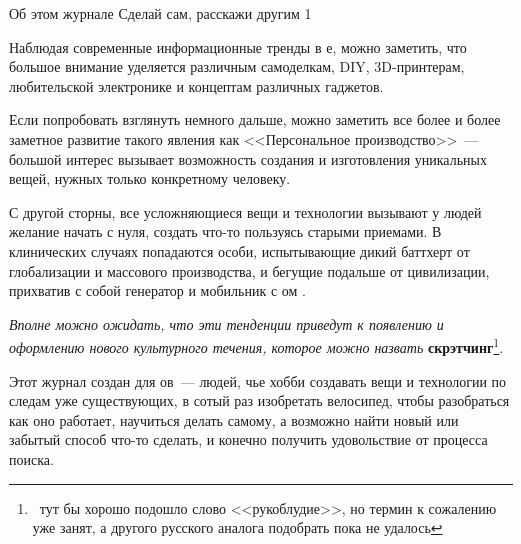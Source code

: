 \begin{editorial}{1}
	{Об этом журнале}
	{Сделай сам, расскажи другим}
	{1}

Наблюдая современные информационные тренды в \internet е, можно заметить, что
большое внимание уделяется различным самоделкам, DIY, 3D-принтерам, любительской
электронике и концептам различных гаджетов.

Если попробовать взглянуть немного дальше, можно заметить все более и более
заметное развитие такого явления как <<Персональное производство>>\ --- большой
интерес вызывает возможность создания и изготовления уникальных вещей, 
нужных только конкретному человеку.

С другой сторны, все усложняющиеся вещи и технологии вызывают у людей желание
начать с нуля, создать что-то пользуясь старыми приемами. В клинических
случаях попадаются особи, испытывающие дикий баттхерт от глобализации и
массового производства, и бегущие подальше от цивилизации, прихватив с собой
генератор и мобильник с \internet ом \smiley.

\emph{
Вполне можно ожидать, что эти тенденции приведут к появлению и оформлению нового
культурного течения, которое можно назвать} \textbf{скрэтчинг}\footnote{\ тут бы
хорошо подошло слово <<рукоблудие>>, но термин к сожалению уже занят, а
другого русского аналога подобрать пока не удалось}.

Этот журнал создан для \scr ов\ --- людей, чье хобби создавать вещи и технологии
по следам уже существующих, в сотый раз изобретать велосипед, чтобы разобраться
как оно работает, научиться делать самому, а возможно найти новый или забытый
способ что-то сделать, и конечно получить удовольствие от процесса поиска. 
	
\authorPonyatov
\end{editorial}

